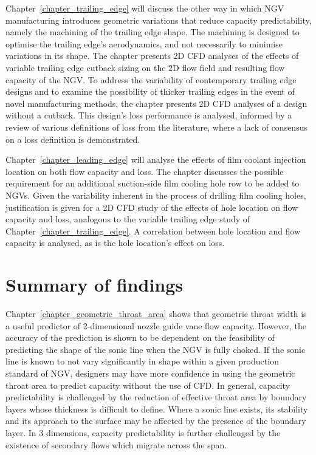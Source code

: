\documentclass[a4paper, 11pt, oneside]{report}
\begin{document}
Chapter~\ref{chapter_trailing_edge} will discuss the other way in which NGV manufacturing introduces geometric variations that reduce capacity predictability, namely the machining of the trailing edge shape. The machining is designed to optimise the trailing edge's aerodynamics, and not necessarily to minimise variations in its shape. The chapter presents 2D CFD analyses of the effects of variable trailing edge cutback sizing on the 2D flow field and resulting flow capacity of the NGV. To address the variability of contemporary trailing edge designs and to examine the possibility of thicker trailing edges in the event of novel manufacturing methods, the chapter presents 2D CFD analyses of a design without a cutback. This design's loss performance is analysed, informed by a review of various definitions of loss from the literature, where a lack of consensus on a loss definition is demonstrated.

Chapter~\ref{chapter_leading_edge} will analyse the effects of film coolant injection location on both flow capacity and loss. The chapter discusses the possible requirement for an additional suction-side film cooling hole row to be added to NGVs. Given the variability inherent in the process of drilling film cooling holes, justification is given for a 2D CFD study of the effects of hole location on flow capacity and loss, analogous to the variable trailing edge study of Chapter~\ref{chapter_trailing_edge}. A correlation between hole location and flow capacity is analysed, as is the hole location's effect on loss. %

\section{Summary of findings}

Chapter~\ref{chapter_geometric_throat_area} shows that geometric throat width is a useful predictor of 2-dimensional nozzle guide vane flow capacity. However, the accuracy of the prediction is shown to be dependent on the feasibility of predicting the shape of the sonic line when the NGV is fully choked. If the sonic line is known to not vary significantly in shape within a given production standard of NGV, designers may have more confidence in using the geometric throat area to predict capacity without the use of CFD. In general, capacity predictability is challenged by the reduction of effective throat area by boundary layers whose thickness is difficult to define. Where a sonic line exists, its stability and its approach to the surface may be affected by the presence of the boundary layer. In 3 dimensions, capacity predictability is further challenged by the existence of secondary flows which migrate across the span.
\end{document}
